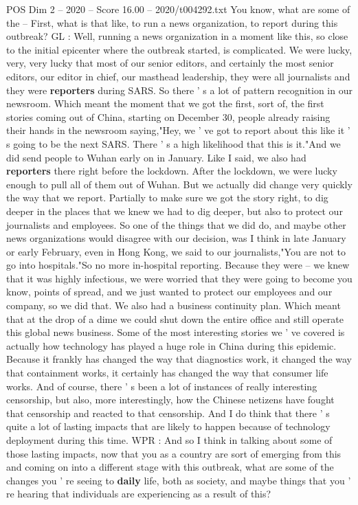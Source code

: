 \begin{textsample}{POS Dim 2 – 2020 – Score 16.00 – 2020/t004292.txt}
You know, what are some of the -- First, what is that like, to run a news organization, to report during this outbreak?
GL : Well, running a news organization in a moment like this, so close to the initial epicenter where the outbreak started, is complicated.
We were lucky, very, very lucky that most of our senior editors, and certainly the most senior editors, our editor in chief, our masthead leadership, they were all journalists and they were \textbf{reporters} during SARS.
So there ' s a lot of pattern recognition in our newsroom.
Which meant the moment that we got the first, sort of, the first stories coming out of China, starting on December 30, people already raising their hands in the newsroom saying,"Hey, we ' ve got to report about this like it ' s going to be the next SARS.
There ' s a high likelihood that this is it."And we did send people to Wuhan early on in January.
Like I said, we also had \textbf{reporters} there right before the lockdown.
After the lockdown, we were lucky enough to pull all of them out of Wuhan.
But we actually did change very quickly the way that we report.
Partially to make sure we got the story right, to dig deeper in the places that we knew we had to dig deeper, but also to protect our journalists and employees.
So one of the things that we did do, and maybe other news organizations would disagree with our decision, was I think in late January or early February, even in Hong Kong, we said to our journalists,"You are not to go into hospitals."So no more in-hospital reporting.
Because they were -- we knew that it was highly infectious, we were worried that they were going to become you know, points of spread, and we just wanted to protect our employees and our company, so we did that.
We also had a business continuity plan.
Which meant that at the drop of a dime we could shut down the entire office and still operate this global news business.
Some of the most interesting stories we ' ve covered is actually how technology has played a huge role in China during this epidemic.
Because it frankly has changed the way that diagnostics work, it changed the way that containment works, it certainly has changed the way that consumer life works.
And of course, there ' s been a lot of instances of really interesting censorship, but also, more interestingly, how the Chinese netizens have fought that censorship and reacted to that censorship.
And I do think that there ' s quite a lot of lasting impacts that are likely to happen because of technology deployment during this time.
WPR : And so I think in talking about some of those lasting impacts, now that you as a country are sort of emerging from this and coming on into a different stage with this outbreak, what are some of the changes you ' re seeing to \textbf{daily} life, both as society, and maybe things that you ' re hearing that individuals are experiencing as a result of this?

\end{textsample}
